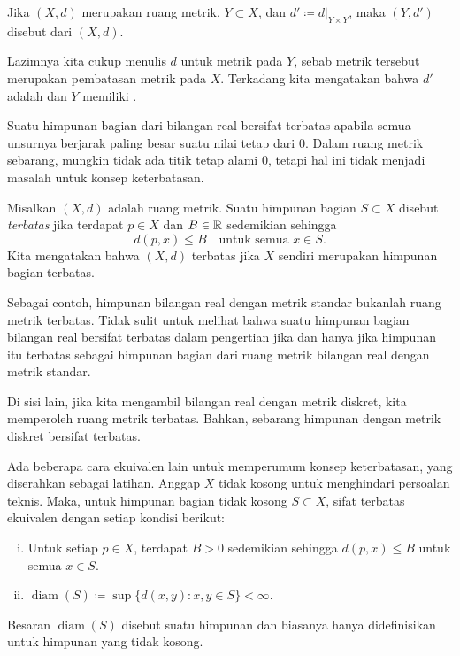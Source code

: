 \begin{defn}
Jika $(X,d)$ merupakan ruang metrik, $Y \subset X$, dan $d' \coloneqq d|_{Y \times Y}$,
maka $(Y,d')$ disebut \emph{} dari $(X,d)$.
\end{defn}

Lazimnya kita cukup menulis $d$ untuk metrik pada $Y$, sebab metrik tersebut
merupakan pembatasan metrik pada $X$.  Terkadang kita mengatakan bahwa $d'$
adalah \emph{} dan $Y$ memiliki
\emph{}.

\medskip

Suatu himpunan bagian dari bilangan real
bersifat terbatas apabila semua unsurnya berjarak paling besar suatu nilai tetap
dari 0.
Dalam ruang metrik sebarang, mungkin tidak ada titik tetap alami 0,
tetapi hal ini tidak menjadi masalah untuk konsep keterbatasan.

\begin{defn}
Misalkan $(X,d)$ adalah ruang metrik.  Suatu himpunan bagian $S \subset X$ disebut
\emph{terbatas} jika terdapat $p \in X$ dan
$B \in {\mathbb{R}}$ sedemikian sehingga
\begin{equation*}
d(p,x) \leq B \quad \text{untuk semua } x \in S.
\end{equation*}
Kita mengatakan bahwa $(X,d)$ terbatas jika $X$ sendiri merupakan himpunan bagian terbatas.
\end{defn}

Sebagai contoh, himpunan bilangan real dengan metrik standar bukanlah
ruang metrik terbatas.  Tidak sulit untuk melihat bahwa suatu
himpunan bagian bilangan real bersifat terbatas dalam
pengertian  jika dan hanya jika himpunan itu terbatas sebagai himpunan bagian dari
ruang metrik bilangan real dengan metrik standar.

Di sisi lain, jika kita mengambil bilangan real dengan metrik diskret,
kita memperoleh ruang metrik terbatas.  Bahkan, sebarang himpunan dengan
metrik diskret bersifat terbatas.

Ada beberapa cara ekuivalen lain untuk memperumum konsep keterbatasan,
yang diserahkan sebagai latihan.  Anggap $X$ tidak kosong untuk menghindari persoalan teknis.
Maka, untuk himpunan bagian tidak kosong $S \subset X$, sifat terbatas ekuivalen dengan setiap kondisi berikut:
\begin{enumerate}[(i)]
\item
Untuk setiap $p \in X$, terdapat $B > 0$ sedemikian sehingga $d(p,x) \leq B$ untuk
semua $x \in S$.
\item
{}%
$\operatorname{diam}(S) \coloneqq \sup \bigl\{ d(x,y) : x,y \in S \bigr\} < \infty$.
\end{enumerate}
Besaran $\operatorname{diam}(S)$ disebut
\emph{} suatu himpunan dan biasanya hanya didefinisikan untuk
himpunan yang tidak kosong.

